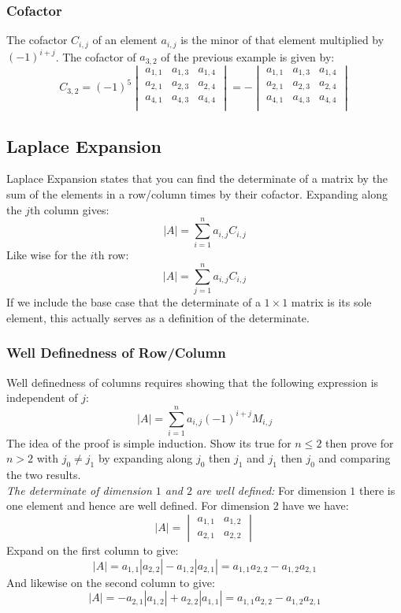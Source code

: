 \subsubsection{Cofactor}
The cofactor $C_{i,j}$ of an element $a_{i,j}$ is the minor of that element multiplied by $(-1)^{i+j}$.
The cofactor of $a_{3,2}$ of the previous example is given by:
\[C_{3,2} = (-1)^5\begin{vmatrix}
	a_{1,1}&a_{1,3}&a_{1,4} \\
	a_{2,1}&a_{2,3}&a_{2,4} \\
	a_{4,1}&a_{4,3}&a_{4,4} \\
\end{vmatrix}= -\begin{vmatrix}
	a_{1,1}&a_{1,3}&a_{1,4} \\
	a_{2,1}&a_{2,3}&a_{2,4} \\
	a_{4,1}&a_{4,3}&a_{4,4} \\
\end{vmatrix}\]

\subsection{Laplace Expansion}
Laplace Expansion states that you can find the determinate of a matrix by the sum of the elements in a row/column times by their cofactor.
Expanding along the $j$th column gives:
\[|A| = \sum_{i=1}^na_{i,j}C_{i,j}\]
Like wise for the $i$th row:
\[|A| = \sum_{j=1}^na_{i,j}C_{i,j}\]
If we include the base case that the determinate of a $1\times 1$ matrix is its sole element,
this actually serves as a definition of the determinate.

\subsubsection{Well Definedness of Row/Column}
Well definedness of columns requires showing that the following expression is independent of $j$:
\[|A| = \sum_{i=1}^na_{i,j}(-1)^{i+j}M_{i,j}\]
The idea of the proof is simple induction.
Show its true for $n\leq 2$
then prove for $n>2$ with $j_0\neq j_1$ by expanding along $j_0$ then $j_1$ and $j_1$ then $j_0$ and comparing the two results.
\\

\textit{The determinate of dimension $1$ and $2$ are well defined:}
For dimension $1$ there is one element and hence are well defined.
For dimension $2$ have we have:
\[|A| = \begin{vmatrix} a_{1,1} & a_{1,2}\\a_{2,1} & a_{2,2}\end{vmatrix}\]
Expand on the first column to give:
\[|A| = a_{1,1}|a_{2,2}|-a_{1,2}|a_{2,1}| = a_{1,1}a_{2,2}-a_{1,2}a_{2,1}\]
And likewise on the second column to give:
\[|A| = -a_{2,1}|a_{1,2}|+a_{2,2}|a_{1,1}| = a_{1,1}a_{2,2}-a_{1,2}a_{2,1}\]

